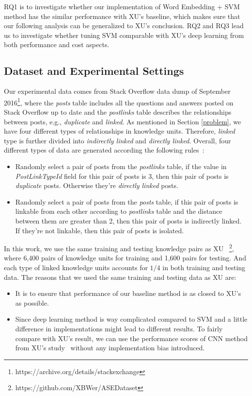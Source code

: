 \documentclass[sigconf,review, anonymous]{acmart}
\theoremstyle{break}
\newcommand{\bi}{\begin{itemize}[leftmargin=0.4cm]}
\newcommand{\ei}{\end{itemize}}
\begin{document}
 RQ1 is to investigate whether our implementation of Word Embedding + SVM method has
 the similar performance with XU's baseline, which makes sure that our following 
 analysis can be generalized to XU's conclusion. RQ2 and RQ3 lead us to
 investigate whether tuning SVM comparable with XU's deep learning from both 
 performance and cost aspects.
 


\subsection{Dataset and Experimental Settings}
Our experimental data comes from Stack Overflow data dump of 
September 2016\footnote{https://archive.org/details/stackexchange},
where the {\it posts} table includes all the questions and answers posted on Stack Overflow
up to date and the {\it postlinks} table describes the relationships between posts, 
e.g., {\it duplicate} and {\it linked}. As mentioned in Section
\ref{problem}, we have four different types of relationships in knowledge units.
Therefore,  {\it linked} type is further divided into {\it indirectly linked} and {\it directly linked}.
Overall, four different types of data are generated according the following rules~\cite{xu2016predicting}:
\bi
\item Randomly select a pair of posts from the {\it postlinks} table, if the value
in  {\it PostLinkTypeId} field for this pair of posts is $3$, then this pair of posts is {\it duplicate} posts. 
Otherwise they're {\it directly linked} posts.

\item Randomly select a pair of posts from the {\it posts} table, if this pair of posts is linkable from each other according to
{\it postlinks} table and the distance between them are greater than 2, then this pair of posts is indirectly linked. If they're
not linkable, then this pair of posts is {isolated}.
\ei

In this work, we use the same training and testing
knowledge pairs as XU ~\cite{xu2016predicting}\footnote{https://github.com/XBWer/ASEDataset}, 
where 6,400 pairs of  knowledge units for training and 1,600 pairs for testing. And each type 
of linked knowledge units accounts for $1/4$ in both training and testing data. The reasons that
we used the same training and testing data as XU are:
\bi
\item It is to ensure that  performance of our baseline method is as closed to XU's as possible.
\item Since deep learning method is way complicated compared to SVM and a little difference in implementations
might lead to different results. To fairly compare with XU's result, we can use the  performance scores
of CNN method from XU's study~\cite{xu2016predicting} without any implementation bias introduced.
\ei
\end{document}
